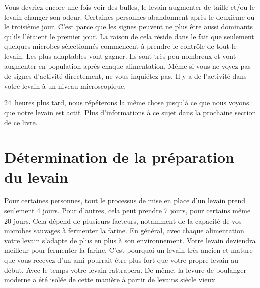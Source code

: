 Vous devriez encore une fois voir des bulles, le levain augmenter
de taille et/ou le levain changer son odeur. Certaines personnes abandonnent
après le deuxième ou le troisième jour. C'est parce que les signes peuvent ne plus
être aussi dominants qu'ils l'étaient le premier jour. La raison de cela réside dans le fait que seulement quelques
microbes sélectionnés commencent à prendre le contrôle de tout le levain. Les plus
adaptables vont gagner. Ils sont très peu nombreux et vont
augmenter en population après chaque alimentation. Même si vous ne voyez pas de signes
d'activité directement, ne vous inquiétez pas. Il y a de l'activité dans
votre levain à un niveau microscopique.

24~heures plus tard, nous répéterons la même chose jusqu'à
ce que nous voyons que notre levain est actif. Plus d'informations à ce sujet dans la
prochaine section de ce livre.

\section{Détermination de la préparation du levain}

Pour certaines personnes, tout le processus de mise en place d'un levain prend
seulement 4 jours. Pour d'autres, cela peut prendre 7 jours, pour certains même 20 jours.
Cela dépend de plusieurs facteurs, notamment de la capacité de vos microbes sauvages
à fermenter la farine. En général, avec chaque alimentation
votre levain s'adapte de plus en plus à son environnement. Votre
levain deviendra meilleur pour fermenter la farine. C'est pourquoi
un levain très ancien et mature que vous recevez d'un ami pourrait
être plus fort que votre propre levain au début. Avec le temps
votre levain rattrapera. De même, la levure de boulanger moderne
a été isolée de cette manière à partir de levains siècle vieux.

